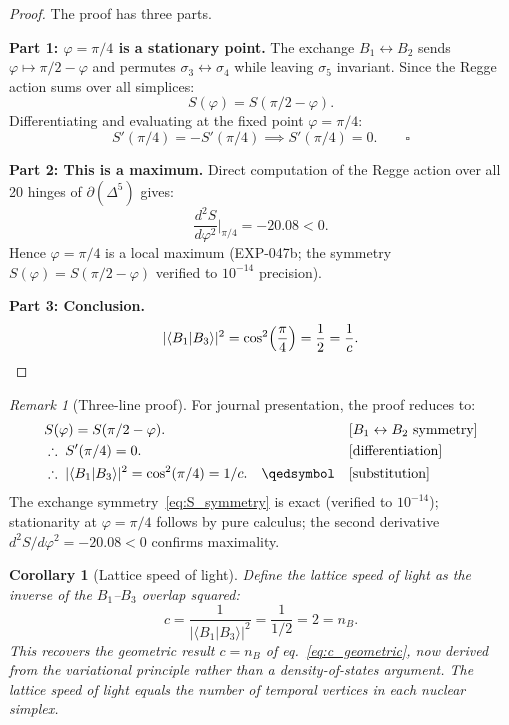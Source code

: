 \documentclass[12pt]{article}
\newtheorem{corollary}[theorem]{Corollary}
\theoremstyle{remark}
\newtheorem{remark}[theorem]{Remark}
\theoremstyle{definition}
\begin{document}
\begin{proof}
The proof has three parts.

\medskip\noindent\textbf{Part 1: $\varphi = \pi/4$ is a stationary point.}
The exchange $B_1 \leftrightarrow B_2$ sends $\varphi \mapsto \pi/2 - \varphi$ and permutes $\sigma_3 \leftrightarrow \sigma_4$ while leaving $\sigma_5$ invariant.  Since the Regge action sums over all simplices:
\begin{equation}\label{eq:S_symmetry}
S(\varphi) = S(\pi/2 - \varphi).
\end{equation}
Differentiating and evaluating at the fixed point $\varphi = \pi/4$:
\begin{equation}
S'(\pi/4) = -S'(\pi/4) \implies S'(\pi/4) = 0. \qquad \square
\end{equation}

\medskip\noindent\textbf{Part 2: This is a maximum.}
Direct computation of the Regge action over all 20 hinges of $\partial(\Delta^5)$ gives:
\begin{equation}
\frac{d^2 S}{d\varphi^2}\bigg|_{\pi/4} = -20.08 < 0.
\end{equation}
Hence $\varphi = \pi/4$ is a local maximum (EXP-047b; the symmetry $S(\varphi) = S(\pi/2 - \varphi)$ verified to $10^{-14}$ precision).

\medskip\noindent\textbf{Part 3: Conclusion.}
\begin{equation}
|\langle B_1 | B_3 \rangle|^2
= \cos^2\!\left(\frac{\pi}{4}\right)
= \frac{1}{2} = \frac{1}{c}. \qedhere
\end{equation}
\end{proof}

\begin{remark}[Three-line proof]
For journal presentation, the proof reduces to:
\begin{align}
&S(\varphi) = S(\pi/2 - \varphi). && [B_1 \leftrightarrow B_2 \text{ symmetry}] \\
&\therefore\; S'(\pi/4) = 0. && [\text{differentiation}] \\
&\therefore\; |\langle B_1|B_3\rangle|^2 = \cos^2(\pi/4) = 1/c. \quad \qedsymbol && [\text{substitution}]
\end{align}
The exchange symmetry~\eqref{eq:S_symmetry} is exact (verified to $10^{-14}$); stationarity at $\varphi = \pi/4$ follows by pure calculus; the second derivative $d^2S/d\varphi^2 = -20.08 < 0$ confirms maximality.
\end{remark}

\begin{corollary}[Lattice speed of light]\label{cor:speed_of_light}
Define the lattice speed of light as the inverse of the
$B_1$--$B_3$ overlap squared:
\begin{equation}
c = \frac{1}{|\langle B_1 | B_3 \rangle|^2} = \frac{1}{1/2} = 2 = n_B.
\end{equation}
This recovers the geometric result $c = n_B$ of
eq.~\eqref{eq:c_geometric}, now derived from the variational
principle rather than a density-of-states argument.  The lattice speed
of light equals the number of temporal vertices in each nuclear
simplex.
\end{corollary}
\end{document}
